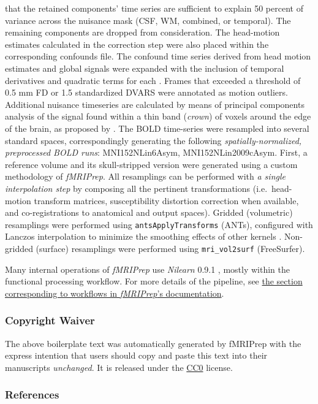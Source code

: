 \documentclass[
]{article}
\begin{document}
\begin{description}
that the retained components' time series are sufficient to explain 50
percent of variance across the nuisance mask (CSF, WM, combined, or
temporal). The remaining components are dropped from consideration. The
head-motion estimates calculated in the correction step were also placed
within the corresponding confounds file. The confound time series
derived from head motion estimates and global signals were expanded with
the inclusion of temporal derivatives and quadratic terms for each
\citep{confounds_satterthwaite_2013}. Frames that exceeded a threshold
of 0.5 mm FD or 1.5 standardized DVARS were annotated as motion
outliers. Additional nuisance timeseries are calculated by means of
principal components analysis of the signal found within a thin band
(\emph{crown}) of voxels around the edge of the brain, as proposed by
\citep{patriat_improved_2017}. The BOLD time-series were resampled into
several standard spaces, correspondingly generating the following
\emph{spatially-normalized, preprocessed BOLD runs}: MNI152NLin6Asym,
MNI152NLin2009cAsym. First, a reference volume and its skull-stripped
version were generated using a custom methodology of \emph{fMRIPrep}.
All resamplings can be performed with \emph{a single interpolation step}
by composing all the pertinent transformations (i.e.~head-motion
transform matrices, susceptibility distortion correction when available,
and co-registrations to anatomical and output spaces). Gridded
(volumetric) resamplings were performed using
\texttt{antsApplyTransforms} (ANTs), configured with Lanczos
interpolation to minimize the smoothing effects of other kernels
\citep{lanczos}. Non-gridded (surface) resamplings were performed using
\texttt{mri\_vol2surf} (FreeSurfer).
\end{description}

Many internal operations of \emph{fMRIPrep} use \emph{Nilearn} 0.9.1
\citep[RRID:SCR\_001362]{nilearn}, mostly within the functional
processing workflow. For more details of the pipeline, see
\href{https://fmriprep.readthedocs.io/en/latest/workflows.html}{the
section corresponding to workflows in \emph{fMRIPrep}'s documentation}.

\hypertarget{copyright-waiver}{%
\subsubsection{Copyright Waiver}\label{copyright-waiver}}

The above boilerplate text was automatically generated by fMRIPrep with
the express intention that users should copy and paste this text into
their manuscripts \emph{unchanged}. It is released under the
\href{https://creativecommons.org/publicdomain/zero/1.0/}{CC0} license.

\hypertarget{references}{%
\subsubsection{References}\label{references}}

  
\end{document}
